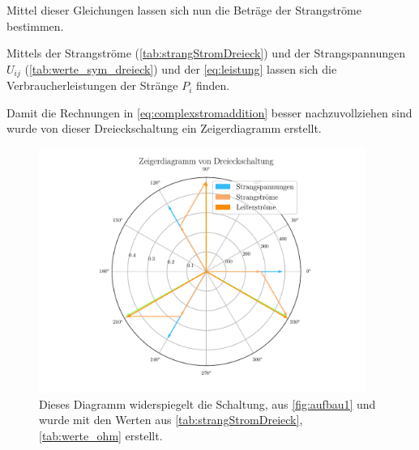 \documentclass[12pt,english,ngerman]{scrartcl}
\begin{document}
Mittel dieser Gleichungen lassen sich nun die Beträge der Strangströme
bestimmen.
\begin{table}[H]
	\caption[Errechnete Strangströme bei der Dreiecksschaltung]{ Errechnete Strangströme
		einer symmetrisch ohmsch-belasteten Dreiecksschaltung, siehe
		\autoref{fig:aufbau1}. Zur Berechnung wurde \autoref{eq:complexstromaddition}
		und die Daten aus \autoref{tab:werte_sym_dreieck} entnommen. \\
		$I_{ij} \dots$ errechnete Strangströme vom i-ten zum j-ten Leiter in \si{\ampere}.
	}\label{tab:strangStromDreieck}
	\centering
	
\end{table}

Mittels der Strangströme (\autoref{tab:strangStromDreieck}) und der
Strangspannungen $U_{ij}$ (\autoref{tab:werte_sym_dreieck}) und der
\autoref{eq:leistung} lassen sich die Verbraucherleistungen der Stränge $P_i$
finden.

\begin{table}[H]
	\caption[Errechnete Leistungen bei der Dreiecksschaltung]{ Errechnete Leistungen bei der
		Dreiecksschaltung                                      \\
		$P_i^C \dots$ errechnete Leistung am i-ten Strang in W \\
		$P_{ges}^C \dots$ errechnete Gesamtleistung in W       \\
		$P_{ges}^M \dots$ gemessene Gesamtleistung in W
	}\label{tab:powerDreieck}
	\centering
	
\end{table}

Damit die Rechnungen in \autoref{eq:complexstromaddition} besser
nachzuvollziehen sind wurde von dieser Dreieckschaltung ein Zeigerdiagramm
erstellt.

\begin{figure}[H]
	\begin{center}
		\includegraphics[width = 0.95\textwidth]{figures/zeigerDreieck.pdf}
	\end{center}
	\caption[Zeigerdiagramm einer sysmetrisch ohmsch-belastete Dreieckschaltung]{ Dieses
		Diagramm widerspiegelt die Schaltung, aus \autoref{fig:aufbau1} und wurde mit
		den Werten aus \autoref{tab:strangStromDreieck}, \autoref{tab:werte_ohm}
		erstellt.
	}\label{fig:zeigerDreieck}
\end{figure}
\end{document}
